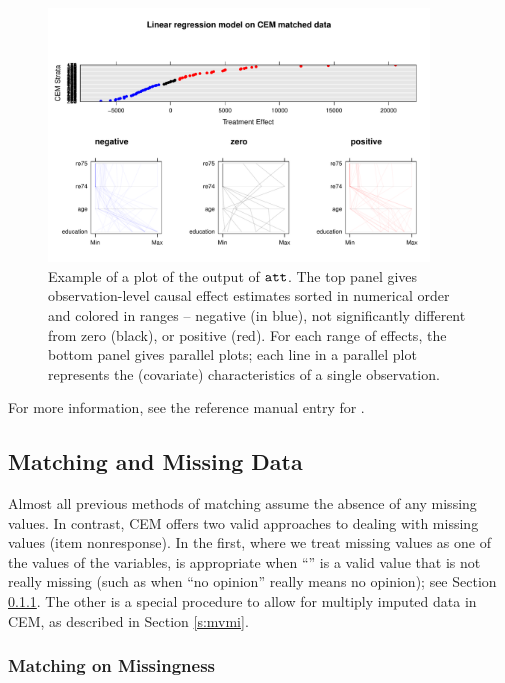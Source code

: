 \documentclass[article]{jss}
\begin{document}
\begin{figure}[Ht]
\begin{center}
\includegraphics[width=0.9\textwidth]{teff} 
\end{center}
\caption{Example of a plot of the output of $\tt att$.  The top panel
  gives observation-level causal effect estimates sorted in numerical
  order and colored in ranges -- negative (in blue), not significantly
  different from zero (black), or positive (red).  For each range of
  effects, the bottom panel gives parallel plots; each line in a
  parallel plot represents the (covariate) characteristics of a single
  observation.}
\label{fig:teff}
\end{figure}
For more
information, see the reference manual entry for .




\subsection{Matching and Missing Data}\label{s:mv}

Almost all previous methods of matching assume the absence of any
missing values.  In contrast, CEM offers two valid approaches to
dealing with missing values (item nonresponse).  In the first, where
we treat missing values as one of the values of the variables, is
appropriate when ``'' is a valid value that is not really
missing (such as when ``no opinion'' really means no opinion); see
Section \ref{s:mvdirect}.  The other is a special procedure to allow
for multiply imputed data in CEM, as described in Section
\ref{s:mvmi}.

\subsubsection{Matching on Missingness}\label{s:mvdirect}
\end{document}
